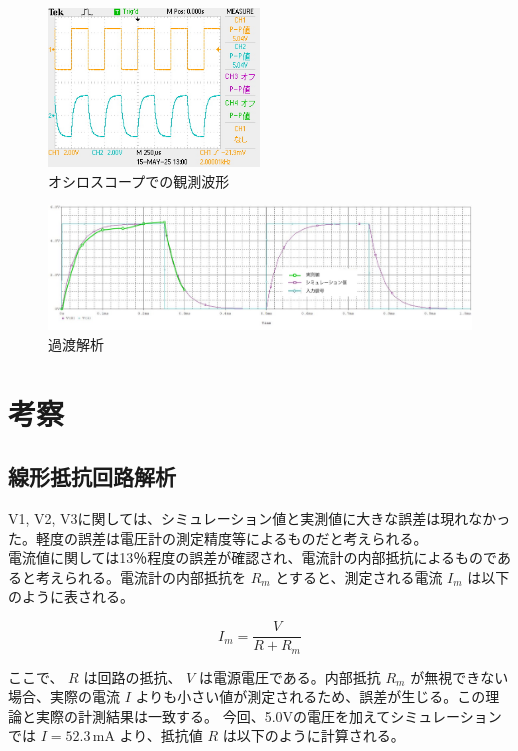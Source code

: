\documentclass{jlreq}
\numberwithin{equation}{section}
\begin{document}
\begin{figure}[H]
  \centering
  \includegraphics[width=0.5\textwidth]{assets/katooshiro.JPG}
  \caption{オシロスコープでの観測波形}
\end{figure}

\begin{figure}[H]
  \centering
  \includegraphics[width=\textwidth]{assets/katokaisekiplot.jpg}
  \caption{過渡解析}
\end{figure}

\section{考察}
\subsection{線形抵抗回路解析}
V1, V2, V3に関しては、シミュレーション値と実測値に大きな誤差は現れなかった。軽度の誤差は電圧計の測定精度等によるものだと考えられる。\\
電流値に関しては13％程度の誤差が確認され、電流計の内部抵抗によるものであると考えられる。電流計の内部抵抗を \( R_m \) とすると、測定される電流 \( I_m \) は以下のように表される。

\[
I_m = \frac{V}{R + R_m}
\]

ここで、 \( R \) は回路の抵抗、 \( V \) は電源電圧である。内部抵抗 \( R_m \) が無視できない場合、実際の電流 \( I \) よりも小さい値が測定されるため、誤差が生じる。この理論と実際の計測結果は一致する。
今回、5.0Vの電圧を加えてシミュレーションでは \( I = 52.3 \, \mathrm{mA} \) より、抵抗値 \( R \) は以下のように計算される。
\end{document}
